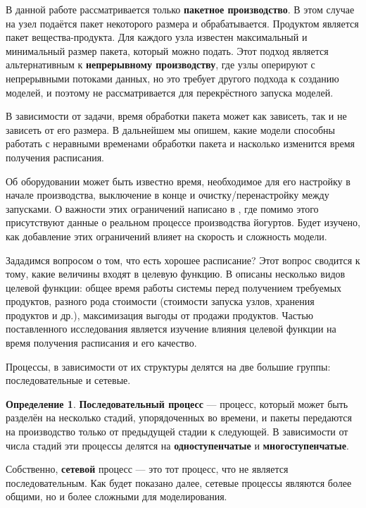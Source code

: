 \documentclass[12pt, twoside]{article}
\theoremstyle{definition}
\newtheorem{definition}[section]{Определение}
\begin{document}
В данной работе рассматривается только \textbf{пакетное производство}. В этом случае на узел подаётся пакет некоторого размера и обрабатывается. Продуктом является пакет вещества-продукта. Для каждого узла известен максимальный и минимальный размер пакета, который можно подать. Этот подход является альтернативным к \textbf{непрерывному производству}, где узлы оперируют с непрерывными потоками данных, но это требует другого подхода к созданию моделей, и поэтому не рассматривается для перекрёстного запуска моделей.

В зависимости от задачи, время обработки пакета может как зависеть, так и не зависеть от его размера. В дальнейшем мы опишем, какие модели способны работать с неравными временами обработки пакета и насколько изменится время получения расписания.

Об оборудовании может быть известно время, необходимое для его настройку в начале производства, выключение в конце и очистку/перенастройку между запусками. О важности этих ограничений написано в \cite{dairy}, где помимо этого присутствуют данные о реальном процессе производства йогуртов. Будет изучено, как добавление этих ограничений влияет на скорость и сложность модели.

Зададимся вопросом о том, что есть хорошее расписание? Этот вопрос сводится к тому, какие величины входят в целевую функцию. В \cite{reallife} описаны несколько видов целевой функции: общее время работы системы перед получением требуемых продуктов, разного рода стоимости (стоимости запуска узлов, хранения продуктов и др.), максимизация выгоды от продажи продуктов. Частью поставленного исследования является изучение влияния целевой функции на время получения расписания и его качество.

Процессы, в зависимости от их структуры делятся на две большие группы: последовательные и сетевые.

\begin{definition} \textbf{Последовательный процесс} --- процесс, который может быть разделён на несколько стадий, упорядоченных во времени, и пакеты передаются на производство только от предыдущей стадии к следующей. В зависимости от числа стадий эти процессы делятся на \textbf{одноступенчатые} и \textbf{многоступенчатые}.
\end{definition}

Собственно, \textbf{сетевой} процесс --- это тот процесс, что не является последовательным. Как будет показано далее, сетевые процессы являются более общими, но и более сложными для моделирования. 
\end{document}
